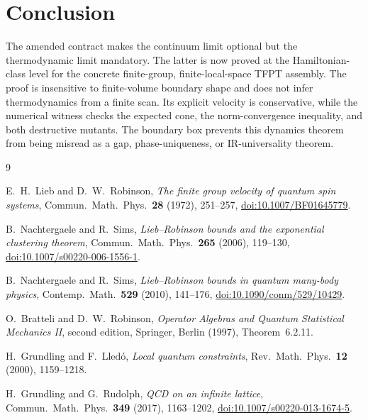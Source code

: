 \documentclass[11pt]{article}
\theoremstyle{remark}
\begin{document}
\section*{Conclusion}

The amended contract makes the continuum limit optional but the
thermodynamic limit mandatory.  The latter is now proved at the
Hamiltonian-class level for the concrete finite-group, finite-local-space
TFPT assembly.  The proof is insensitive to finite-volume boundary shape
and does not infer thermodynamics from a finite scan.  Its explicit
velocity is conservative, while the numerical witness checks the expected
cone, the norm-convergence inequality, and both destructive mutants.
The boundary box prevents this dynamics theorem from being misread as a
gap, phase-uniqueness, or IR-universality theorem.

\begin{thebibliography}{9}

E.~H.~Lieb and D.~W.~Robinson,
\emph{The finite group velocity of quantum spin systems},
Commun.\ Math.\ Phys.\ \textbf{28} (1972), 251--257,
\href{https://doi.org/10.1007/BF01645779}
{doi:10.1007/BF01645779}.

B.~Nachtergaele and R.~Sims,
\emph{Lieb--Robinson bounds and the exponential clustering theorem},
Commun.\ Math.\ Phys.\ \textbf{265} (2006), 119--130,
\href{https://doi.org/10.1007/s00220-006-1556-1}
{doi:10.1007/s00220-006-1556-1}.

B.~Nachtergaele and R.~Sims,
\emph{Lieb--Robinson bounds in quantum many-body physics},
Contemp.\ Math.\ \textbf{529} (2010), 141--176,
\href{https://doi.org/10.1090/conm/529/10429}
{doi:10.1090/conm/529/10429}.

O.~Bratteli and D.~W.~Robinson,
\emph{Operator Algebras and Quantum Statistical Mechanics II},
second edition, Springer, Berlin (1997), Theorem~6.2.11.

H.~Grundling and F.~Lled\'o,
\emph{Local quantum constraints},
Rev.\ Math.\ Phys.\ \textbf{12} (2000), 1159--1218.

H.~Grundling and G.~Rudolph,
\emph{QCD on an infinite lattice},
Commun.\ Math.\ Phys.\ \textbf{349} (2017), 1163--1202,
\href{https://doi.org/10.1007/s00220-013-1674-5}
{doi:10.1007/s00220-013-1674-5}.

\end{thebibliography}
\end{document}
